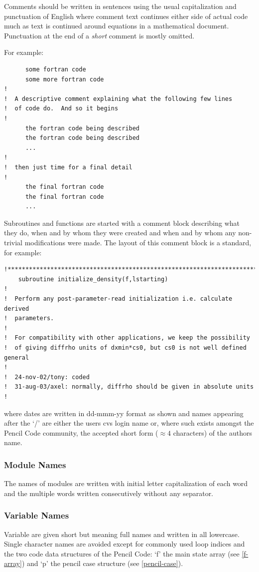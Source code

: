 \documentclass[\mydriver,12pt,twoside,notitlepage,a4paper]{article}
\begin{document}
Comments should be written in sentences using the usual capitalization 
and punctuation of English where comment text continues either side of
actual code much as text is continued around equations in a mathematical
document. Punctuation at the end of a \emph{short} comment is mostly omitted. 

For example:
\begin{verbatim}
      some fortran code
      some more fortran code
!
!  A descriptive comment explaining what the following few lines
!  of code do.  And so it begins
!
      the fortran code being described
      the fortran code being described
      ...
!
!  then just time for a final detail
!
      the final fortran code 
      the final fortran code
      ...
\end{verbatim}

Subroutines and functions are started with a comment block describing
what they do, when and by whom they were created and when and by whom any
non-trivial modifications were made.  The layout of this comment block
is a standard, for example:
\begin{verbatim}
!***********************************************************************
    subroutine initialize_density(f,lstarting)
!
!  Perform any post-parameter-read initialization i.e. calculate derived
!  parameters.
!
!  For compatibility with other applications, we keep the possibility
!  of giving diffrho units of dxmin*cs0, but cs0 is not well defined general
!
!  24-nov-02/tony: coded 
!  31-aug-03/axel: normally, diffrho should be given in absolute units
!
\end{verbatim}
where dates are written in dd-mmm-yy format as shown and names appearing
after the `/' are either the users cvs login name or, where such exists
amongst the {\sc Pencil Code} community, the accepted short form ($\approx 4$ 
characters) of the authors name.

\subsubsection{Module Names}
The names of modules are written with initial letter capitalization 
of each word and the multiple words written consecutively without
any separator.

\subsubsection{Variable Names}
Variable are given short but meaning full names and written
in all lowercase.  Single character names are avoided except
for commonly used loop indices and the two code data structures
of the {\sc Pencil Code}: `f' the main state array (see \ref{f-array}) and `p' the pencil case
structure (see \ref{pencil-case}).
\end{document}
